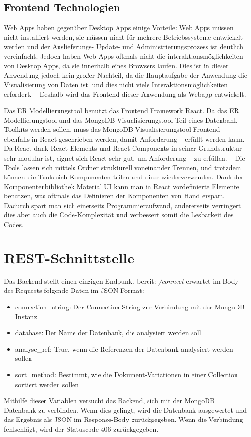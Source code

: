 \subsection{Frontend Technologien}
\label{sec:verwendete_technologien_frontend}

Web Apps haben gegenüber Desktop Apps einige Vorteile:
Web Apps müssen nicht installiert werden, sie müssen nicht für mehrere Betriebssysteme entwickelt werden und der Auslieferungs- Update- und Administrierungsprozess ist deutlich vereinfacht.
Jedoch haben Web Apps oftmals nicht die interaktionsmöglichkeiten von Desktop Apps, da sie innerhalb eines Browsers laufen.
Dies ist in dieser Anwendung jedoch kein großer Nachteil, da die Hauptaufgabe der Anwendung die Visualisierung von Daten ist, und dies nicht viele Interaktionsmöglichkeiten erfordert.
~\autocite{zepeda2007desktop}
Deshalb wird das Frontend dieser Anwendung als Webapp entwickelt.

Das ER Modellierungstool benutzt das Frontend Framework React.
Da das ER Modellierungstool und das MongoDB Visualisierungstool Teil eines Datenbank Toolkits werden sollen, muss das MongoDB Visualisierungstool Frontend ebenfalls in React geschrieben werden, damit Anforderung ~ erfüllt werden kann.
Da React dank React Elements und React Components in seiner Grundstruktur  sehr modular ist, eignet sich React sehr gut, um Anforderung ~ zu erfüllen.
~\autocite{banks:react}
Die Tools lassen sich mittels Ordner strukturell voneinander Trennen, und trotzdem können die Tools sich Komponenten teilen und diese wiederverwenden.
Dank der Komponentenbibliothek Material UI kann man in React vordefinierte Elemente benutzen, was oftmals das Definieren der Komponenten von Hand erspart.
Dadurch spart man sich einerseits Programmieraufwand, andererseits verringert dies aber auch die Code-Komplexität und verbessert somit die Lesbarkeit des Codes.
~\autocite{mui:mui}

\section{REST-Schnittstelle}
\label{sec:rest_schnittstelle}
Das Backend stellt einen einzigen Endpunkt bereit: 
\textit{/connect} erwartet im Body des Requests folgende Daten im JSON-Format:
\begin{itemize}
    \item connection\_string: Der Connection String zur Verbindung mit der MongoDB Instanz
    \item database: Der Name der Datenbank, die analysiert werden soll
    \item analyse\_ref: True, wenn die Referenzen der Datenbank analysiert werden sollen
    \item sort\_method: Bestimmt, wie die Dokument-Variationen in einer Collection sortiert werden sollen
\end{itemize}
Mithilfe dieser Variablen versucht das Backend, sich mit der MongoDB Datenbank zu verbinden.
Wenn dies gelingt, wird die Datenbank ausgewertet und das Ergebnis als JSON im Response-Body zurückgegeben.
Wenn die Verbindung fehlschlägt, wird der Statuscode 406 zurückgegeben.

